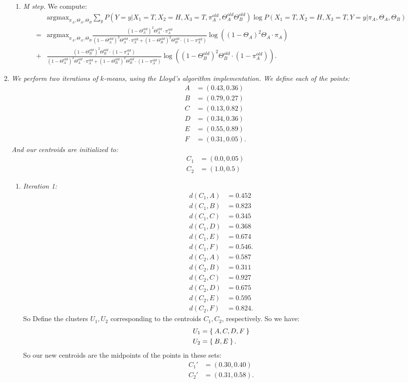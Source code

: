 \documentclass[12pt,oneside,reqno]{amsart}
\theoremstyle{plain}
\theoremstyle{definition}
\theoremstyle{remark}
\newcommand{\bee}{\begin{equation}\begin{aligned}}
\newcommand{\eee}{\end{aligned}\end{equation}}
\begin{document}
\begin{enumerate}[label=\arabic*.]
\begin{enumerate}
\item \textit{M step. }
We compute:
\tiny
\bee
&\text{argmax}_{\pi_A,\Theta_A,\Theta_B}\sum_y P(Y = y|X_1 = T,X_2 = H,X_3 = T,\pi_A^{old},\Theta_A^{old}\Theta_B^{old})\log P(X_1 = T,X_2 = H,X_3 = T,Y=y|\pi_A,\Theta_A,\Theta_B)\\
=&\text{argmax}_{\pi_A,\Theta_A,\Theta_B}\frac{(1 - \Theta_A^{old})^2\Theta_A^{old}\cdot \pi_A^{old}}{(1 - \Theta_A^{old})^2\Theta_A^{old}\cdot \pi_A^{old} + (1 - \Theta_B^{old})^2\Theta_B^{old}\cdot (1 - \pi_A^{old})}\log ((1 - \Theta_A)^2\Theta_A\cdot \pi_A)\\
+&\frac{(1 - \Theta_B^{old})^2\Theta_B^{old}\cdot (1 - \pi_A^{old})}{(1 - \Theta_A^{old})^2\Theta_A^{old}\cdot \pi_A^{old} + (1 - \Theta_B^{old})^2\Theta_B^{old}\cdot (1 - \pi_A^{old})}\log ((1 - \Theta_B^{old})^2\Theta_B^{old}\cdot (1 - \pi_A^{old})).
\eee
\end{enumerate}

\item \textit{We perform two iterations of $k$-means, using the Lloyd's algorithm implementation. We define each of the points:
\bee
A &= (0.43,0.36)\\
B &= (0.79,0.27)\\
C &= (0.13,0.82)\\
D &= (0.34,0.36)\\
E &= (0.55,0.89)\\
F &= (0.31,0.05).
\eee
And our centroids are initialized to:
\bee
C_1 &= (0.0,0.05)\\
C_2 &= (1.0,0.5)
\eee
}
\begin{enumerate}
\item \textit{Iteration 1:}
\bee
d(C_1,A) &= 0.452\\
d(C_1,B) &= 0.823\\
d(C_1,C) &= 0.345\\
d(C_1,D) &= 0.368\\
d(C_1,E) &= 0.674\\
d(C_1,F) &= 0.546.
\eee
\bee
d(C_2,A) &= 0.587\\
d(C_2,B) &= 0.311\\
d(C_2,C) &= 0.927\\
d(C_2,D) &= 0.675\\
d(C_2,E) &= 0.595\\
d(C_2,F) &= 0.824.
\eee
So Define the clusters $U_1,U_2$ corresponding to the centroids $C_1,C_2$, respectively. So we have:
\bee
U_1 &= \Set{A,C,D,F}\\
U_2 &= \Set{B,E}.
\eee
So our new centroids are the midpoints of the points in these sets:
\bee
C_1' &= (0.30,0.40)\\
C_2' &= (0.31,0.58).
\eee


\end{enumerate}
\end{enumerate}
\end{document}
